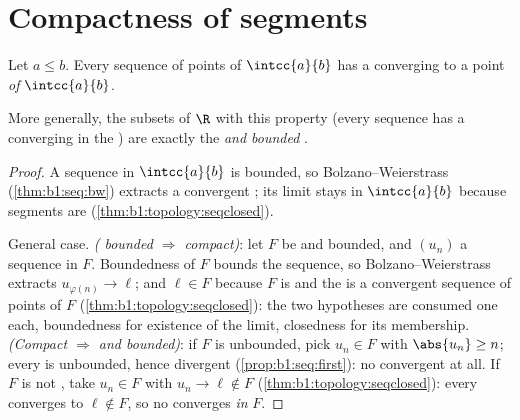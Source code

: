 \section{Compactness of segments}

\begin{theorem}\label{thm:b1:topology:compact}
Let $a \leq b$. Every sequence of points of $\intcc{a}{b}$ has a
 converging to a point \emph{of}
$\intcc{a}{b}$.

More generally, the subsets of $\R$ with this property (every
sequence has a  converging in the ) are exactly the
\emph{ and bounded} .
\end{theorem}

\begin{proof}
A sequence in $\intcc{a}{b}$ is bounded, so Bolzano--Weierstrass
(\cref{thm:b1:seq:bw}) extracts a convergent ; its limit
stays in $\intcc{a}{b}$ because segments are 
(\cref{thm:b1:topology:seqclosed}).

General case. \emph{( bounded $\Rightarrow$ compact)}: let
$F$ be  and bounded, and $(u_n)$ a sequence in $F$.
Boundedness of $F$ bounds the sequence, so Bolzano--Weierstrass
extracts $u_{\varphi(n)} \to \ell$; and $\ell \in F$ because $F$
is  and the  is a convergent sequence of points
of $F$ (\cref{thm:b1:topology:seqclosed}): the two hypotheses
are consumed one each, boundedness for existence of the limit,
closedness for its membership. \emph{(Compact $\Rightarrow$  and
bounded)}: if $F$ is unbounded, pick $u_n \in F$ with $\abs{u_n} \geq
n$; every  is unbounded, hence divergent
(\cref{prop:b1:seq:first}): no convergent  at all. If $F$
is not , take $u_n \in F$ with $u_n \to \ell \notin F$
(\cref{thm:b1:topology:seqclosed}): every  converges to
$\ell \notin F$, so no  converges \emph{in} $F$.
\end{proof}

